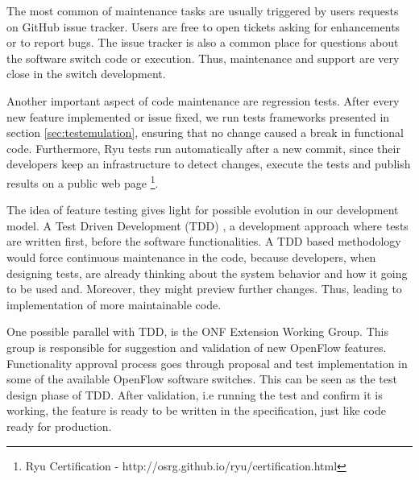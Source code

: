 The most common of maintenance tasks are usually triggered by users requests on GitHub issue tracker. Users are free to open tickets asking for enhancements or to report bugs. The issue tracker is also a common place for questions about the software switch code or execution. Thus, maintenance and support are very close in the switch development.          

Another important aspect of code maintenance are regression tests. After every new feature implemented or issue fixed, we run tests frameworks presented in section \ref{sec:testemulation}, ensuring that no change caused a break in functional code. Furthermore, Ryu tests run automatically after a new commit, since their developers keep an infrastructure to detect changes, execute the tests and publish results on a public web page \footnote{Ryu Certification - http://osrg.github.io/ryu/certification.html}. 

The idea of feature testing gives light for possible evolution in our development model. A Test Driven Development (TDD) \cite{Nagappan:2008:RQI:1380662.1380664}, a development approach where tests are written first, before the software functionalities. A TDD based methodology would force continuous maintenance in the code, because developers, when designing tests, are already thinking about the system behavior and how it going to be used and. Moreover, they might preview further changes. Thus, leading to implementation of more maintainable code. 

One possible parallel with TDD,  is the ONF Extension Working Group. This group is responsible for suggestion and validation of new OpenFlow features. Functionality approval process goes through proposal and test implementation in some of the available OpenFlow software switches. This can be seen as the test design phase of TDD. After validation, i.e running the test and confirm it is working, the feature is ready to be written in the specification, just like code ready for production.                 




 